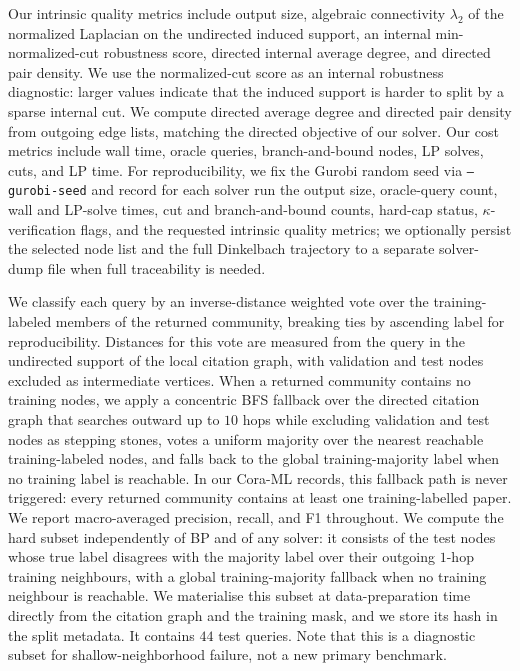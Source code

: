 \documentclass[12pt]{article}
\begin{document}
Our intrinsic quality metrics include output size, algebraic connectivity $\lambda_2$ of the normalized Laplacian on the undirected induced support, an internal min-normalized-cut robustness score, directed internal average degree, and directed pair density.  We use the normalized-cut score as an internal robustness diagnostic: larger values indicate that the induced support is harder to split by a sparse internal cut.  We compute directed average degree and directed pair density from outgoing edge lists, matching the directed objective of our solver.  Our cost metrics include wall time, oracle queries, branch-and-bound nodes, LP solves, cuts, and LP time.  For reproducibility, we fix the Gurobi random seed via \texttt{--gurobi-seed} and record for each solver run the output size, oracle-query count, wall and LP-solve times, cut and branch-and-bound counts, hard-cap status, $\kappa$-verification flags, and the requested intrinsic quality metrics; we optionally persist the selected node list and the full Dinkelbach trajectory to a separate solver-dump file when full traceability is needed.

We classify each query by an inverse-distance weighted vote over the training-labeled members of the returned community, breaking ties by ascending label for reproducibility.  Distances for this vote are measured from the query in the undirected support of the local citation graph, with validation and test nodes excluded as intermediate vertices.  When a returned community contains no training nodes, we apply a concentric BFS fallback over the directed citation graph that searches outward up to $10$ hops while excluding validation and test nodes as stepping stones, votes a uniform majority over the nearest reachable training-labeled nodes, and falls back to the global training-majority label when no training label is reachable.  In our Cora-ML records, this fallback path is never triggered: every returned community contains at least one training-labelled paper.  We report macro-averaged precision, recall, and F1 throughout.  We compute the hard subset independently of BP and of any solver: it consists of the test nodes whose true label disagrees with the majority label over their outgoing $1$-hop training neighbours, with a global training-majority fallback when no training neighbour is reachable.  We materialise this subset at data-preparation time directly from the citation graph and the training mask, and we store its hash in the split metadata.  It contains $44$ test queries.  Note that this is a diagnostic subset for shallow-neighborhood failure, not a new primary benchmark.
\end{document}
